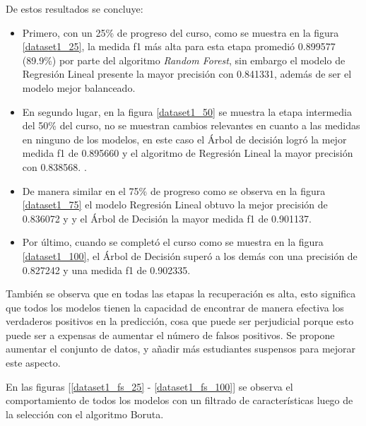 De estos resultados se concluye:  
\begin{itemize}
    \item Primero, con un 25\% de progreso del curso, como se muestra en la figura \ref{dataset1_25}, la medida f1 más alta para 
    esta etapa promedió 0.899577 (89.9\%) por parte del algoritmo \textit{Random Forest}, sin embargo el modelo de Regresión Lineal presente la mayor precisión con 0.841331, además de ser el modelo mejor balanceado.
    \item En segundo lugar, en la figura \ref{dataset1_50} se muestra la etapa intermedia del 50\% del curso, no se muestran cambios relevantes en cuanto a las medidas en ninguno de los modelos, en este caso el Árbol de decisión logró la mejor medida f1 de 0.895660 y el algoritmo de Regresión Lineal la mayor precisión con 0.838568. .
    \item De manera similar en el 75\% de progreso como se observa en la figura \ref{dataset1_75} el modelo Regresión Lineal obtuvo la mejor precisión de 0.836072 y y el Árbol de Decisión la mayor medida f1 de 0.901137. 
    \item Por último, cuando se completó el curso como se muestra en la figura \ref{dataset1_100}, el Árbol de Decisión superó a los demás con una precisión de 0.827242 y una medida f1 de 0.902335. 
\end{itemize}

También se observa que en todas las etapas la recuperación es alta, esto significa que todos los modelos tienen la capacidad de encontrar de manera efectiva los verdaderos positivos en la predicción, cosa que puede ser perjudicial porque esto puede ser a expensas de aumentar el número de falsos positivos. Se propone aumentar el conjunto de datos, y añadir más estudiantes suspensos para mejorar este aspecto. 


En las figuras [\ref{dataset1_fs_25} - \ref{dataset1_fs_100}] se observa el comportamiento de todos los modelos con un filtrado de características luego de la selección con el algoritmo Boruta.

